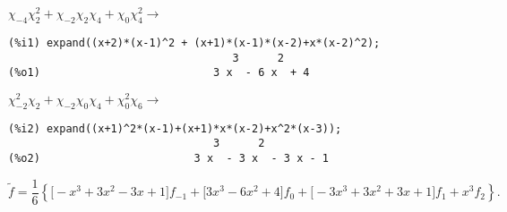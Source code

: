 $\chi_{-4}\chi_2^2 + \chi_{-2}\chi_2\chi_4 + \chi_0\chi_4^2\to$
\begin{verbatim}
(%i1) expand((x+2)*(x-1)^2 + (x+1)*(x-1)*(x-2)+x*(x-2)^2);
                                   3      2
(%o1)                           3 x  - 6 x  + 4
\end{verbatim}

$ \chi_{-2}^2\chi_{2} + \chi_{-2}\chi_{0}\chi_4 + \chi_{0}^2\chi_6\to$
\begin{verbatim}
(%i2) expand((x+1)^2*(x-1)+(x+1)*x*(x-2)+x^2*(x-3));
                                3      2
(%o2)                        3 x  - 3 x  - 3 x - 1
\end{verbatim}
$$
\widetilde f = \frac16\left\{ \Big[-x^3 +3x^2-3x+1 \Big]f_{-1} +  \Big[3x^3-6x^2+4\Big] f_0 + \Big[-3x^3+3x^2+3x+1\Big] f_1 + x^3 f_2 \right\}.
$$

